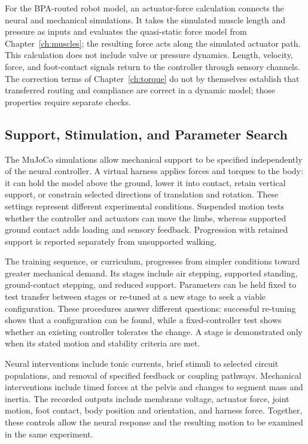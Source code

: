 For the BPA-routed robot model, an actuator-force calculation connects the neural and mechanical simulations. It takes the simulated muscle length and pressure as inputs and evaluates the quasi-static force model from Chapter~\ref{ch:muscles}; the resulting force acts along the simulated actuator path. This calculation does not include valve or pressure dynamics. Length, velocity, force, and foot-contact signals return to the controller through sensory channels. The correction terms of Chapter~\ref{ch:torque} do not by themselves establish that transferred routing and compliance are correct in a dynamic model; those properties require separate checks.

\subsection{Support, Stimulation, and Parameter Search}\label{sec:sns_experiment_controls}

The MuJoCo simulations allow mechanical support to be specified independently of the neural controller. A virtual harness applies forces and torques to the body: it can hold the model above the ground, lower it into contact, retain vertical support, or constrain selected directions of translation and rotation. These settings represent different experimental conditions. Suspended motion tests whether the controller and actuators can move the limbs, whereas supported ground contact adds loading and sensory feedback. Progression with retained support is reported separately from unsupported walking.

The training sequence, or curriculum, progresses from simpler conditions toward greater mechanical demand. Its stages include air stepping, supported standing, ground-contact stepping, and reduced support. Parameters can be held fixed to test transfer between stages or re-tuned at a new stage to seek a viable configuration. These procedures answer different questions: successful re-tuning shows that a configuration can be found, while a fixed-controller test shows whether an existing controller tolerates the change. A stage is demonstrated only when its stated motion and stability criteria are met.

Neural interventions include tonic currents, brief stimuli to selected circuit populations, and removal of specified feedback or coupling pathways. Mechanical interventions include timed forces at the pelvis and changes to segment mass and inertia. The recorded outputs include membrane voltage, actuator force, joint motion, foot contact, body position and orientation, and harness force. Together, these controls allow the neural response and the resulting motion to be examined in the same experiment.

